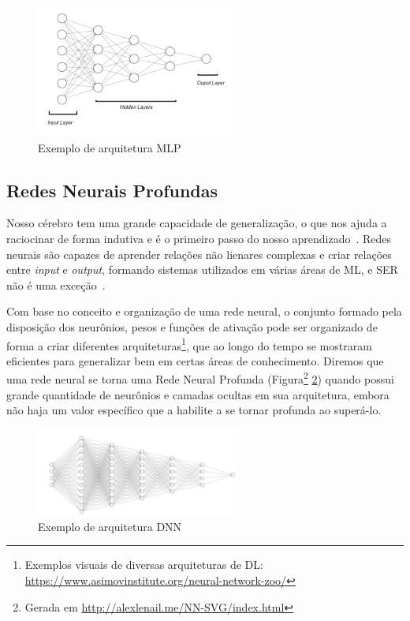 \begin{figure}[!h]
\centering
\includegraphics[width=0.6\textwidth]{img/mlp02.png}
\caption{\label{fig:mlp}Exemplo de arquitetura \acrshort{MLP}}

\end{figure}

\subsection{Redes Neurais Profundas}

Nosso cérebro tem uma grande capacidade de generalização, o que nos ajuda a raciocinar de forma indutiva e é o primeiro passo do nosso aprendizado~\cite{32}. Redes neurais são capazes de aprender relações não lienares complexas e criar relações entre \textit{input} e \textit{output}, formando sistemas utilizados em várias áreas de \acrshort{ML}, e \acrshort{SER} não é uma exceção~\cite{32.74}.

Com base no conceito e organização de uma rede neural, o conjunto formado pela disposição dos neurônios, pesos e funções de ativação pode ser organizado de forma a criar diferentes arquiteturas\footnote{Exemplos visuais de diversas arquiteturas de DL: \url{https://www.asimovinstitute.org/neural-network-zoo/}}, que ao longo do tempo se mostraram eficientes para generalizar bem em certas áreas de conhecimento. Diremos que uma rede neural se torna uma Rede Neural Profunda (Figura\footnote{Gerada em \url{http://alexlenail.me/NN-SVG/index.html}} \ref{fig:exarqdnn}) quando possui grande quantidade de neurônios e camadas ocultas em sua arquitetura, embora não haja um valor específico que a habilite a se tornar profunda ao superá-lo.

\begin{figure}[!h]
\centering
\includegraphics[width=0.6\textwidth]{img/ex-dnn.JPG}
\caption{\label{fig:exarqdnn}Exemplo de arquitetura \acrlong{DNN}}
\end{figure}

